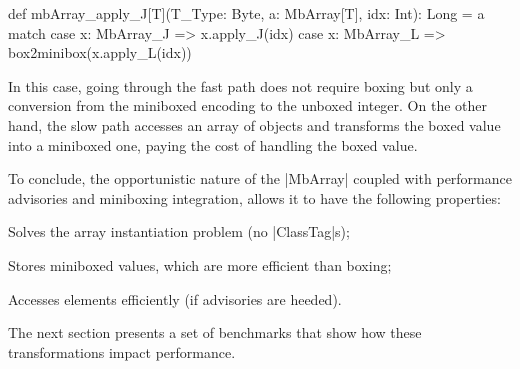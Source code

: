 \begin{lstlisting-nobreak}
 def mbArray_apply_J[T](T_Type: Byte, a: MbArray[T], idx: Int): Long =
   a match {
     case x: MbArray_J => x.apply_J(idx)
     case x: MbArray_L => box2minibox(x.apply_L(idx))
   }
\end{lstlisting-nobreak}

In this case, going through the fast path does not require boxing but only a conversion from the miniboxed encoding to the unboxed integer. On the other hand, the slow path accesses an array of objects and transforms the boxed value into a miniboxed one, paying the cost of handling the boxed value.

To conclude, the opportunistic nature of the |MbArray| coupled with performance advisories and miniboxing integration, allows it to have the following properties:
\begin{compactitem}
  \item Solves the array instantiation problem (no |ClassTag|s);
  \item Stores miniboxed values, which are more efficient than boxing;
  \item Accesses elements efficiently (if advisories are heeded).
\end{compactitem}

The next section presents a set of benchmarks that show how these transformations impact performance.

